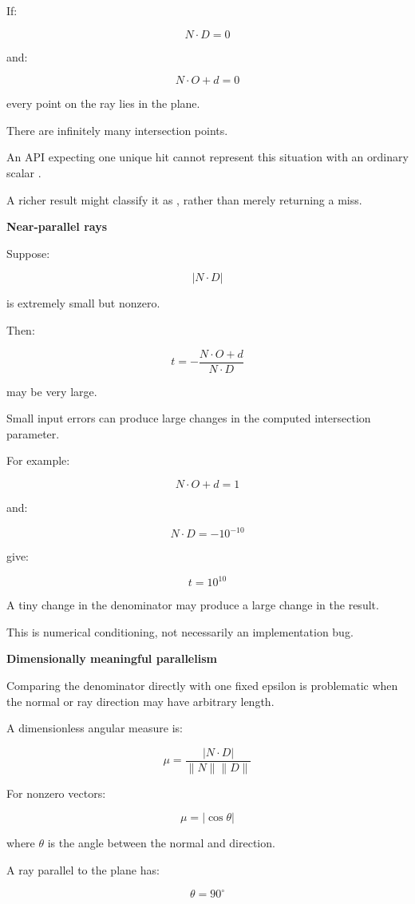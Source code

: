 If:

\[
N\cdot D=0
\]

and:

\[
N\cdot O+d=0
\]

every point on the ray lies in the plane.

There are infinitely many intersection points.

An API expecting one unique hit cannot represent this situation with an ordinary scalar .

A richer result might classify it as , rather than merely returning a miss.

\textbf{Near-parallel rays}

Suppose:

\[
|N\cdot D|
\]

is extremely small but nonzero.

Then:

\[
t=-\frac{N\cdot O+d}{N\cdot D}
\]

may be very large.

Small input errors can produce large changes in the computed intersection parameter.

For example:

\[
N\cdot O+d=1
\]

and:

\[
N\cdot D=-10^{-10}
\]

give:

\[
t=10^{10}
\]

A tiny change in the denominator may produce a large change in the result.

This is numerical conditioning, not necessarily an implementation bug.

\textbf{Dimensionally meaningful parallelism}

Comparing the denominator directly with one fixed epsilon is problematic when the normal or ray direction may have arbitrary length.

A dimensionless angular measure is:

\[
\boxed{ \mu= \frac{|N\cdot D|}{\|N\|\|D\|} }
\]

For nonzero vectors:

\[
\mu=|\cos\theta|
\]

where \(\theta\) is the angle between the normal and direction.

A ray parallel to the plane has:

\[
\theta=90^\circ
\]

